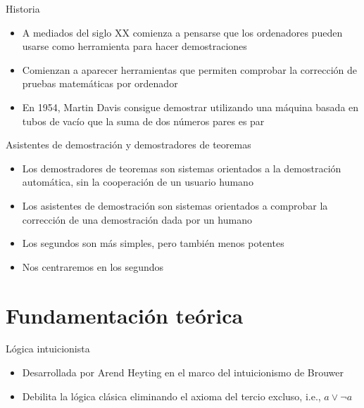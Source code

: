 \documentclass[10pt]{beamer}
\begin{document}
\begin{frame}{Historia}

  \begin{itemize}
  \item A mediados del siglo XX comienza a pensarse que los
    ordenadores pueden usarse como herramienta para hacer
    demostraciones
  \item Comienzan a aparecer herramientas que permiten comprobar la
    corrección de pruebas matemáticas por ordenador
  \item En 1954, Martin Davis consigue demostrar utilizando una
    máquina basada en tubos de vacío que la suma de dos números pares
    es par
  \end{itemize}

\end{frame}

\begin{frame}{Asistentes de demostración y demostradores de teoremas}

  \begin{itemize}
  \item Los demostradores de teoremas son sistemas orientados a la
    demostración automática, sin la cooperación de un usuario humano
  \item Los asistentes de demostración son sistemas orientados a
    comprobar la corrección de una demostración dada por un humano
  \item Los segundos son más simples, pero también menos potentes
  \item Nos centraremos en los segundos
  \end{itemize}

\end{frame}

\section{Fundamentación teórica}

\begin{frame}[fragile]{Lógica intuicionista}

  \begin{itemize}
  \item Desarrollada por Arend Heyting en el marco del intuicionismo de Brouwer
  \item Debilita la lógica clásica eliminando el axioma del tercio excluso, i.e., $a \lor \neg a$
  \end{itemize}

\end{frame}
\end{document}
